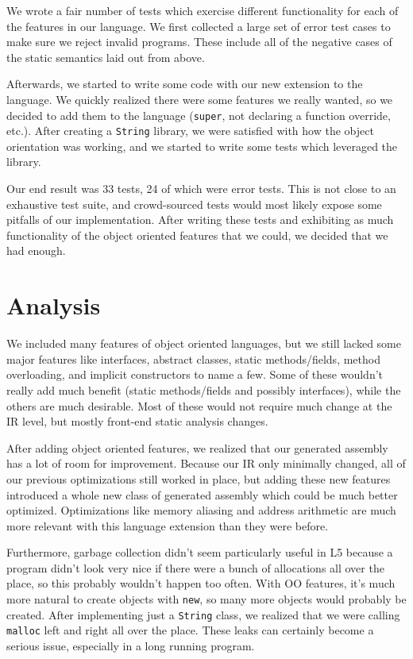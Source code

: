 \documentclass{article}
\begin{document}
We wrote a fair number of tests which exercise different
functionality for each of the features in our language. We first collected a
large set of error test cases to make sure we reject invalid programs. These
include all of the negative cases of the static semantics laid out from above.

Afterwards, we started to write some code with our new extension to the
language. We quickly realized there were some features we really wanted, so we
decided to add them to the language (\texttt{super}, not declaring a function
override, etc.). After creating a \texttt{String} library, we were satisfied
with how the object orientation was working, and we started to write some tests
which leveraged the library.

Our end result was 33 tests, 24 of which were error tests. This is not close to
an exhaustive test suite, and crowd-sourced tests would most likely expose some
pitfalls of our implementation. After writing these tests and exhibiting as much
functionality of the object oriented features that we could, we decided that
we had enough.

\section{Analysis}

We included many features of object oriented languages, but we still lacked some
major features like interfaces, abstract classes, static methods/fields, method
overloading, and implicit constructors to name a few. Some of these wouldn't
really add much benefit (static methods/fields and possibly interfaces), while
the others are much desirable. Most of these would not require much change at
the IR level, but mostly front-end static analysis changes.

After adding object oriented features, we realized that our generated assembly
has a lot of room for improvement. Because our IR only minimally changed, all of
our previous optimizations still worked in place, but adding these new features
introduced a whole new class of generated assembly which could be much better
optimized. Optimizations like memory aliasing and address arithmetic are much
more relevant with this language extension than they were before.

Furthermore, garbage collection didn't seem particularly useful in L5 because
a program didn't look very nice if there were a bunch of allocations all over
the place, so this probably wouldn't happen too often. With OO features, it's
much more natural to create objects with \texttt{new}, so many more objects
would probably be created. After implementing just a \texttt{String} class, we
realized that we were calling \texttt{malloc} left and right all over the place.
These leaks can certainly become a serious issue, especially in a long running
program.
\end{document}

